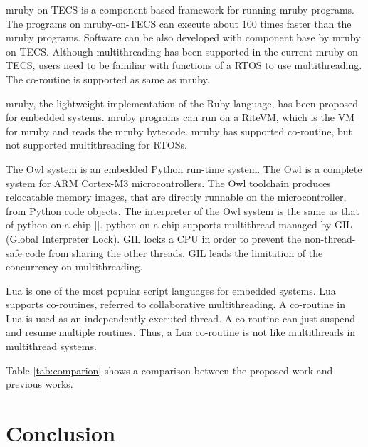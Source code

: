 \documentclass[conference,compsoc]{IEEEtran}
\begin{document}
mruby on TECS is a component-based framework for running mruby programs.
The programs on mruby-on-TECS can execute about 100 times faster than the mruby programs.
Software can be also developed with component base by mruby on TECS.
Although multithreading has been supported in the current mruby on TECS, users need to be familiar with functions of a RTOS to use multithreading.
The co-routine is supported as same as mruby.

mruby, the lightweight implementation of the Ruby language, has been proposed for embedded systems.
mruby programs can run on a RiteVM, which is the VM for mruby and reads the mruby bytecode.
mruby has supported co-routine, but not supported multithreading for RTOSs.

The Owl system is an embedded Python run-time system.
The Owl is a complete system for ARM Cortex-M3 microcontrollers.
The Owl toolchain produces relocatable memory images, that are directly runnable on the microcontroller, from Python code objects.
The interpreter of the Owl system is the same as that of python-on-a-chip [].
python-on-a-chip supports multithread managed by GIL (Global Interpreter Lock).
GIL locks a CPU in order to prevent the non-thread-safe code from sharing the other threads.
GIL leads the limitation of the concurrency on multithreading.

Lua is one of the most popular script languages for embedded systems.
Lua supports co-routines, referred to collaborative multithreading.
A co-routine in Lua is used as an independently executed thread.
A co-routine can just suspend and resume multiple routines. 
Thus, a Lua co-routine is not like multithreads in multithread systems.

Table \ref{tab:comparion} shows a comparison between the proposed work and previous works.

\section{Conclusion}
\label{sec:Conclusion}


\end{document}
